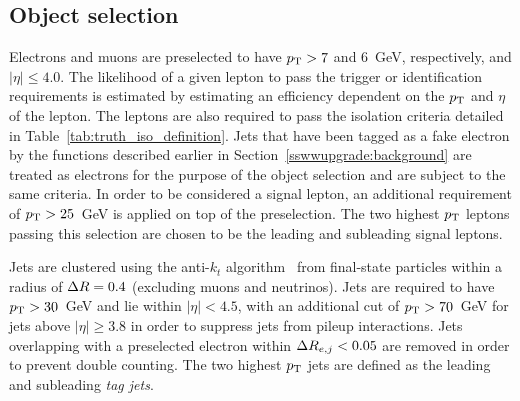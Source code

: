 \subsection{Object selection}\label{sswwupgrade:object_selection}
Electrons and muons are preselected to have $p_{\mathrm{T}} > 7$ and 6~GeV, respectively, and $|\eta| \le 4.0$.
The likelihood of a given lepton to pass the trigger or identification requirements is estimated by estimating an efficiency dependent on the $p_{\mathrm{T}}$ and $\eta$ of the lepton.
The leptons are also required to pass the isolation criteria detailed in Table~\ref{tab:truth_iso_definition}.
Jets that have been tagged as a fake electron by the functions described earlier in Section~\ref{sswwupgrade:background} are treated as electrons for the purpose of the object selection and are subject to the same criteria.
In order to be considered a signal lepton, an additional requirement of $p_{\mathrm{T}} > 25$~GeV is applied on top of the preselection.
The two highest $p_{\mathrm{T}}$ leptons passing this selection are chosen to be the leading and subleading signal leptons.

Jets are clustered using the anti-$k_t$ algorithm~\cite{2008.antikt} from final-state particles within a radius of $\Delta R = 0.4$ (excluding muons and neutrinos).
Jets are required to have $p_{\mathrm{T}} > 30$~GeV and lie within $|\eta| < 4.5$, with an additional cut of $p_{\mathrm{T}} > 70$~GeV for jets above $|\eta| \ge 3.8$ in order to suppress jets from pileup interactions.
Jets overlapping with a preselected electron within $\Delta R_{e,j} < 0.05$ are removed in order to prevent double counting.
The two highest $p_{\mathrm{T}}$ jets are defined as the leading and subleading \emph{tag jets}.


